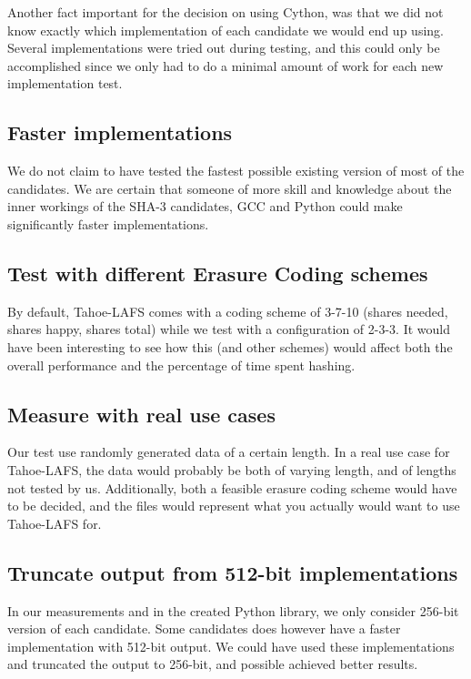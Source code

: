 \documentclass[english,12pt,a4paper]{book}
\begin{document}
Another fact important for the decision on using Cython, was that we did not
know exactly which implementation of each candidate we would end up using.
Several implementations were tried out during testing, and this could only be
accomplished since we only had to do a minimal amount of work for each new
implementation test.

\subsection{Faster implementations}

We do not claim to have tested the fastest possible existing version
of most of the candidates. We are certain that someone of more skill and
knowledge about the inner workings of the \ac{SHA}-3 candidates, \ac{GCC} and
Python could make significantly faster implementations.

\subsection{Test with different Erasure Coding schemes}

By default, Tahoe-\ac{LAFS} comes with a coding scheme of 3-7-10 (shares needed,
shares happy, shares total) while we test with a configuration of 2-3-3. It
would have been interesting to see how this (and other schemes) would affect
both the overall performance and the percentage of time spent hashing.

\subsection{Measure with real use cases}

Our test use randomly generated data of a certain length. In a real use case for
Tahoe-\ac{LAFS}, the data would probably be both of varying length, and of
lengths not tested by us. Additionally, both a feasible erasure coding
scheme would have to be decided, and the files would represent what you actually
would want to use Tahoe-\ac{LAFS} for.

\subsection{Truncate output from 512-bit implementations}

In our measurements and in the created Python library, we only consider 256-bit
version of each candidate. Some candidates does however have a faster
implementation with 512-bit output. We could have used these implementations and
truncated the output to 256-bit, and possible achieved better results.
\end{document}
